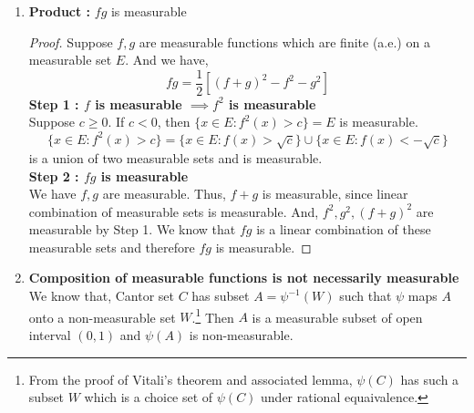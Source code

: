 \begin{enumerate}
\begin{proof}
		\textbf{Step 2 : $f,g$ are measurable $\implies f+g$ is measurable}\\
		\begin{align*}
			f(x)+g(x) < c \iff & f(x) <  c - g(x) 
			\intertext{Since $\mathbb{Q}$ is dense, there exists a rational number $q \in \mathbb{Q}$ between any two distinct real numbers}
                        f(x) + g(x) < c\iff & \exists q \in \mathbb{Q},\ f(x) < q < c-g(x) \\
			\iff & f(x) < q \text{ AND } g(x) < c-q
		\end{align*}
		\begin{align*}
			\{ x \in E : f+g(x) < c \} = & \{ x \in E : f(x) + g(x) < c \} \\
			= & \bigcup_{q \in \mathbb{Q}} \left[ \{ x \in E : f(x) < c \} \cap \{ x \in E : g(x) < c - q \} \right]
		\end{align*}
		Since, $f,g$ are measurable, each set in the union is measurable.
		Thus, $\{ x \in E : f+g(x) < c\}$ is measurable for every $c \in \mathbb{R}$, since rational numbers are countable, and countable union of measurable sets is measurable.
		Therefore, $f+g$ is measurable.
	\end{proof}
\item \textbf{ Product : }$fg$ is measurable
	\begin{proof}
		Suppose $f,g$ are measurable functions {\color{red}which are finite (a.e.)} on a measurable set $E$.
		And we have,
		\begin{equation}
			fg = \frac{1}{2} \left[ (f+g)^2 - f^2 - g^2 \right]
		\end{equation}
		\textbf{Step 1 : $f$ is measurable $\implies f^2$ is measurable}\\
		Suppose $c \ge 0$.
		If $c < 0$, then $\{ x \in E : f^2(x) > c \} = E$ is measurable.
		\begin{equation*}
			\{ x \in E : f^2(x) > c \} = \{ x \in E : f(x) > \sqrt{c} \} \cup \{ x \in E : f(x) < -\sqrt{c} \}
		\end{equation*}
		is a union of two measurable sets and is measurable.\\

		\textbf{Step 2 : $fg$ is measurable} \\
		We have $f,g$ are measurable.
		Thus, $f+g$ is measurable, since linear combination of measurable sets is measurable.
		And, $f^2,g^2,(f+g)^2$ are measurable by Step 1.
		We know that $fg$ is a linear combination of these measurable sets and therefore $fg$ is measurable.
	\end{proof}
\item \textbf{Composition of measurable functions is not necessarily measurable}\\
	We know that, Cantor set $C$ has subset $A = \psi^{-1}(W)$ such that $\psi$ maps $A$ onto a non-measurable set $W$.\dag\footnote{
		From the proof of Vitali's theorem and associated lemma, $\psi(C)$ has such a subset $W$ which is a choice set of $\psi(C)$ under rational equaivalence.}
	Then $A$ is a measurable subset of open interval $(0,1)$ and $\psi(A)$ is non-measurable.\\
		

\end{enumerate}
